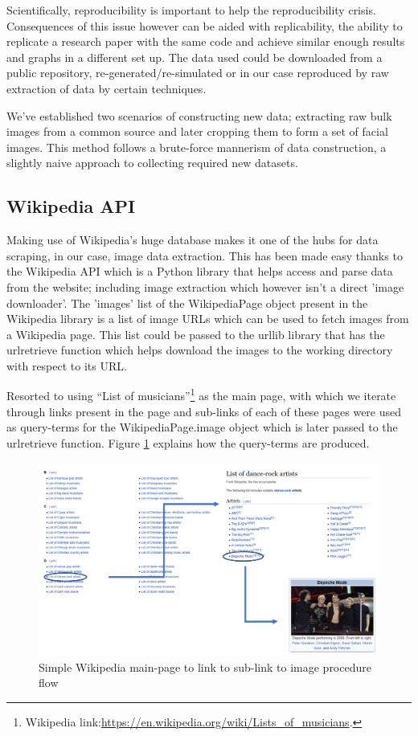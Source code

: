 \documentclass[preprint,12pt]{elsarticle}
\begin{document}
Scientifically, reproducibility is important to help the reproducibility crisis. Consequences of this issue however can be aided with replicability, the ability to replicate a research paper with the same code and achieve similar enough results and graphs in a different set up. The data used could be downloaded from a public repository, re-generated/re-simulated or in our case reproduced by raw extraction of data by certain techniques. 

We've established two scenarios of constructing new data; extracting raw bulk images from a common source and later cropping them to form a set of facial images. This method follows a brute-force mannerism of data construction, a slightly naive approach to collecting required new datasets.

\subsection{Wikipedia API}
Making use of Wikipedia's huge database makes it one of the hubs for data scraping, in our case, image data extraction. This has been made easy thanks to the Wikipedia API which is a Python library that helps access and parse data from the website; including image extraction which however isn't a direct 'image downloader'. The 'images' list of the WikipediaPage object present in the Wikipedia library is a list of image URLs which can be used to fetch images from a Wikipedia page. This list could be passed to the urllib library that has the urlretrieve function which helps download the images to the working directory with respect to its URL.

Resorted to using “List of musicians”\footnote{Wikipedia link:\url{https://en.wikipedia.org/wiki/Lists_of_musicians}.} as the main page, with which we iterate through links present in the page and sub-links of each of these pages were used as query-terms for the WikipediaPage.image object which is later passed to the urlretrieve function. Figure \ref{fig:WikiExtract} explains how the query-terms are produced. 

\begin{figure}[ht]
\centering\includegraphics[width=0.5\linewidth]{wikipedia_extractor.png}
\caption{Simple Wikipedia main-page to link to sub-link to image procedure flow}
\label{fig:WikiExtract}
\end{figure}
\end{document}

